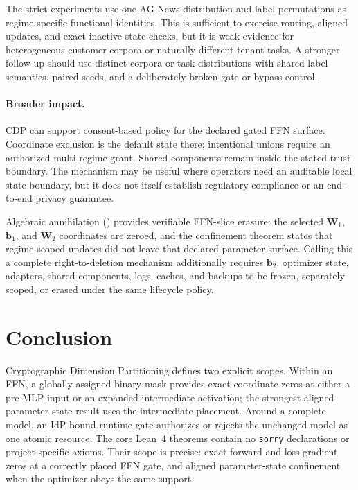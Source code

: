 \documentclass[11pt,a4paper]{article}
\newcommand{\bW}{\mathbf{W}}
\begin{document}
The strict experiments use one AG News distribution and label
permutations as regime-specific functional identities.  This is
sufficient to exercise routing, aligned updates, and exact inactive
state checks, but it is weak evidence for heterogeneous customer
corpora or naturally different tenant tasks.  A stronger follow-up
should use distinct corpora or task distributions with shared label
semantics, paired seeds, and a deliberately broken gate or bypass
control.

\paragraph{Broader impact.}
CDP can support consent-based policy for the declared gated FFN surface.
Coordinate exclusion is the default state there; intentional unions
require an authorized multi-regime grant.  Shared components remain
inside the stated trust boundary.  The mechanism may be useful where
operators need an auditable local state boundary, but it does not
itself establish regulatory compliance or an end-to-end privacy
guarantee.

Algebraic annihilation () provides verifiable
FFN-slice erasure: the selected $\bW_1$, $\mathbf{b}_1$, and $\bW_2$
coordinates are zeroed, and the confinement theorem states that
regime-scoped updates did not leave that declared parameter surface.
Calling this a complete right-to-deletion mechanism additionally
requires $\mathbf{b}_2$, optimizer state, adapters, shared
components, logs, caches, and backups to be frozen, separately
scoped, or erased under the same lifecycle policy.

\section{Conclusion}
\label{sec:conclusion}

Cryptographic Dimension Partitioning defines two explicit scopes.
Within an FFN, a globally assigned binary mask provides exact
coordinate zeros at either a pre-MLP input or an expanded intermediate
activation; the strongest aligned parameter-state result uses the
intermediate placement.  Around a complete model, an IdP-bound runtime
gate authorizes or rejects the unchanged model as one atomic resource.
The core Lean~4 theorems contain no \texttt{sorry} declarations or
project-specific axioms.  Their scope is precise: exact forward and
loss-gradient zeros at a correctly placed FFN gate, and aligned
parameter-state confinement when the optimizer obeys the same support.
\end{document}
